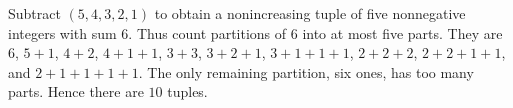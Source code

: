 Subtract $(5,4,3,2,1)$ to obtain a nonincreasing tuple of five nonnegative integers with sum $6$. Thus count partitions of $6$ into at most five parts. They are $6$, $5+1$, $4+2$, $4+1+1$, $3+3$, $3+2+1$, $3+1+1+1$, $2+2+2$, $2+2+1+1$, and $2+1+1+1+1$. The only remaining partition, six ones, has too many parts. Hence there are $\boxed{10}$ tuples.
